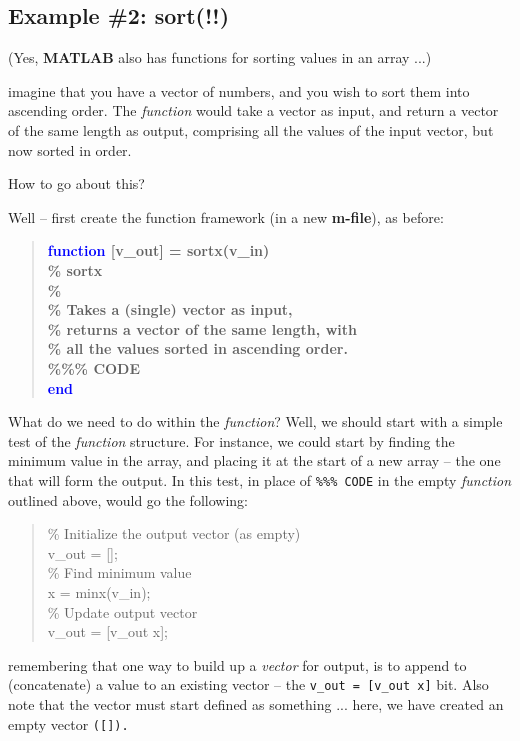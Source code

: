 \documentclass{tufte-book} %
\newenvironment{docspec}{\begin{quotation}\ttfamily\parskip0pt\parindent0pt\ignorespaces}{\end{quotation}}
\newenvironment{docspecbold}{\begin{quotation}\ttfamily\bfseries\parskip0pt\parindent0pt\ignorespaces}{\end{quotation}}
\begin{document}

\subsection{Example \#2: sort(!!)}

(Yes, \textbf{MATLAB} also has functions for sorting values in an array ...)

\vspace{-4mm}
 imagine that you have a vector of numbers, and you wish to sort them into ascending order. The \textit{function} would take a vector as input, and return a vector of the same length as output, comprising all the values of the input vector, but now sorted in order.

How to go about this?

Well -- first create the function framework (in a new \textbf{m-file}), as before:
\vspace{-1mm}
\begin{docspecbold}
\textcolor{blue}{function} [v\_out] = sortx(v\_in)\\
\textcolor[rgb]{0,0.501961,0}{\% sortx\\
\%\\
\% Takes a (single) vector as input, \\ \% returns a vector of the same length, with \\ \% all the values sorted in ascending order.}\\
\textcolor[rgb]{0,0.501961,0}{\%\%\% CODE} \\
\textcolor{blue}{end}
\end{docspecbold}
\vspace{-1mm}

What do we need to do within the \textit{function}? Well, we should start with a simple test of the \textit{function} structure. For instance, we could start by finding the minimum value in the array, and placing it at the start of a new array -- the one that will form the output. In this test, in place of \texttt{\textcolor[rgb]{0,0.501961,0}{\%\%\% CODE}} in the empty \textit{function} outlined above, would go the following:
\begin{docspec}
\textcolor[rgb]{0,0.501961,0}{\% Initialize the output vector (as empty)}\\
v\_out = [];\\
\textcolor[rgb]{0,0.501961,0}{\% Find minimum value}\\
x = minx(v\_in);\\
\textcolor[rgb]{0,0.501961,0}{\% Update output vector}\\
v\_out = [v\_out x];
\end{docspec}
remembering that one way to build up a \textit{vector} for output, is to append to (concatenate) a value to an existing vector -- the \texttt{v\_out = [v\_out x]} bit. Also note that the vector must start defined as something ... here, we have created an empty vector \texttt{([]).}
\end{document}
